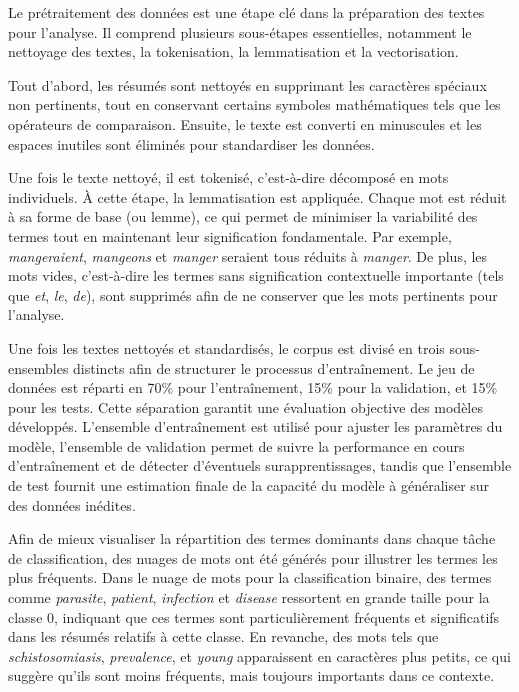 \documentclass[12pt]{report}
\begin{document}
Le prétraitement des données est une étape clé dans la préparation des textes pour l’analyse. Il comprend plusieurs sous-étapes essentielles, notamment le nettoyage des textes, la tokenisation, la lemmatisation et la vectorisation.

Tout d'abord, les résumés sont nettoyés en supprimant les caractères spéciaux non pertinents, tout en conservant certains symboles mathématiques tels que les opérateurs de comparaison. Ensuite, le texte est converti en minuscules et les espaces inutiles sont éliminés pour standardiser les données.

Une fois le texte nettoyé, il est tokenisé, c'est-à-dire décomposé en mots individuels. À cette étape, la lemmatisation est appliquée. Chaque mot est réduit à sa forme de base (ou lemme), ce qui permet de minimiser la variabilité des termes tout en maintenant leur signification fondamentale. Par exemple, \textit{mangeraient}, \textit{mangeons} et \textit{manger} seraient tous réduits à \textit{manger}. De plus, les mots vides, c'est-à-dire les termes sans signification contextuelle importante (tels que \textit{et}, \textit{le}, \textit{de}), sont supprimés afin de ne conserver que les mots pertinents pour l'analyse.

Une fois les textes nettoyés et standardisés, le corpus est divisé en trois sous-ensembles distincts afin de structurer le processus d’entraînement. Le jeu de données est réparti en 70\% pour l’entraînement, 15\% pour la validation, et 15\% pour les tests. Cette séparation garantit une évaluation objective des modèles développés. L'ensemble d'entraînement est utilisé pour ajuster les paramètres du modèle, l'ensemble de validation permet de suivre la performance en cours d'entraînement et de détecter d’éventuels surapprentissages, tandis que l’ensemble de test fournit une estimation finale de la capacité du modèle à généraliser sur des données inédites.

Afin de mieux visualiser la répartition des termes dominants dans chaque tâche de classification, des nuages de mots ont été générés pour illustrer les termes les plus fréquents. Dans le nuage de mots pour la classification binaire, des termes comme \textit{parasite}, \textit{patient}, \textit{infection} et \textit{disease} ressortent en grande taille pour la classe 0, indiquant que ces termes sont particulièrement fréquents et significatifs dans les résumés relatifs à cette classe. En revanche, des mots tels que \textit{schistosomiasis}, \textit{prevalence}, et \textit{young} apparaissent en caractères plus petits, ce qui suggère qu’ils sont moins fréquents, mais toujours importants dans ce contexte.
\end{document}
